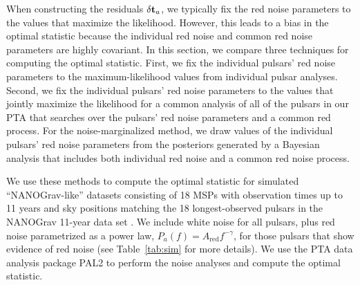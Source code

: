 \documentclass[twocolumn,aps,prd,superscriptaddress]{revtex4-1}
\newcommand{\res}{\ensuremath{\delta {\bf t}}}
\begin{document}
When constructing the residuals $\res_a$, 
we typically fix the red noise parameters to the values that 
maximize the likelihood. 
However, this leads to a bias in the optimal statistic 
because the individual red noise and common red noise parameters 
are highly covariant. 
In this section, we compare three techniques for computing the optimal statistic. 
First, we fix the individual pulsars' red noise parameters to the 
maximum-likelihood values from individual pulsar analyses. 
Second, we fix the individual pulsars' red noise parameters to the 
values that jointly maximize the likelihood for a common analysis 
of all of the pulsars in our PTA 
that searches over the pulsars' red noise parameters and 
a common red process. 
For the noise-marginalized method, we draw values of the individual pulsars' 
red noise parameters from the posteriors generated by a Bayesian analysis 
that includes both individual red noise and a common red noise process. 

We use these methods to compute the optimal statistic 
for simulated ``NANOGrav-like'' datasets 
consisting of 18 MSPs with observation times up to 11 years 
and sky positions matching the 18 longest-observed pulsars in the 
NANOGrav 11-year data set \citep{abb+17}. 
We include white noise for all pulsars, plus 
red noise parametrized as a power law, $P_a(f) = A_\mathrm{red} f^{-\gamma}$, 
for those pulsars that show evidence of red noise 
(see Table~\ref{tab:sim} for more details).
We use the PTA data analysis package 
PAL2 %
\citep{evh17a}
to perform the noise analyses and compute the optimal statistic.
\end{document}
